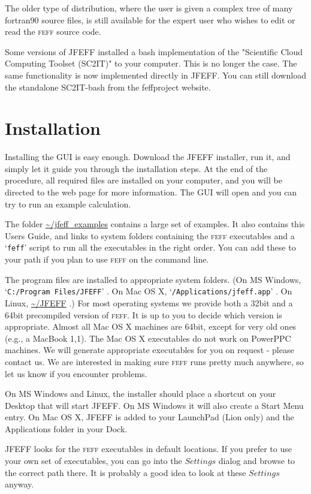 \documentclass[11pt,oneside]{report} %
\newcommand{\program}[1]{\textsc{#1}}
\newcommand{\feff}{\program{feff}}
\newcommand{\file}[1]{`\texttt{#1}'}
\begin{document}
\begin{latexonly}
The older type of distribution, where the user is given a complex tree of many fortran90 source files, is still available for the expert user who wishes to edit or read the {\feff} source code.

Some versions of JFEFF installed a bash implementation of the "Scientific Cloud Computing Toolset (SC2IT)" to your computer.  This is no longer the case.  The same functionality is now implemented directly in JFEFF.  You can still download the standalone SC2IT-bash from the feffproject website.
  

\section{Installation}
\label{sec:installation}

Installing the GUI is easy enough.  Download the JFEFF installer, run it, and simply let it guide you through the installation steps.  At the end of the procedure, all required files are installed on your computer, and you will be directed to the web page for more information.  The GUI will open and you can try to run an example calculation.  

The folder \url{~/jfeff_examples} contains a large set of examples.  It also contains this Users Guide, and links to system folders containing the {\feff} executables and a \file{feff} script to run all the executables in the right order.  You can add these to your path if you plan to use {\feff} on the command line.

The program files are installed to appropriate system folders.  (On MS Windows, \file{C:/Program Files/JFEFF} .  On Mac OS X, \file{/Applications/jfeff.app} .  On Linux, \url{~/JFEFF} .)  For most operating systems we provide both a 32bit and a 64bit precompiled version of {\feff}.  It is up to you to decide which version is appropriate.  Almost all Mac OS X machines are 64bit, except for very old ones (e.g., a MacBook 1,1).  The Mac OS X executables do not work on PowerPPC machines.  We will generate appropriate executables for you on request - please contact us.  We are interested in making sure {\feff} runs pretty much anywhere, so let us know if you encounter problems. 

On MS Windows and Linux, the installer should place a shortcut on your Desktop that will start JFEFF.  On MS Windows it will also create a Start Menu entry.  On Mac OS X, JFEFF is added to your LaunchPad (Lion only) and the Applications folder in your Dock.  

JFEFF looks for the {\feff} executables in default locations.  If you prefer to use your own set of executables, you can go into the $Settings$ dialog and browse to the correct path there.  It is probably a good idea to look at these $Settings$ anyway.


\end{latexonly}
\end{document}
